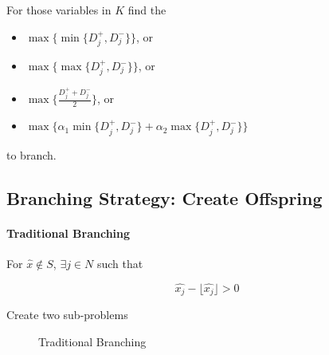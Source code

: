                 For those variables in $K$ find the
                \begin{itemize}
                    \item $\max \{\min\{ {D_j^+},  {D_j^-}\}\}$, or
                    \item $\max \{\max\{ {D_j^+},  {D_j^-}\}\}$, or
                    \item $\max \{\frac{D_j^+ + D_j^-}{2}\}$, or
                    \item $\max \{\alpha_1\min\{ {D_j^+},  {D_j^-}\} + \alpha_2\max\{ {D_j^+},  {D_j^-}\}\}$
                \end{itemize}
                
                to branch.

        \subsection{Branching Strategy: Create Offspring}

            \paragraph{Traditional Branching}
                For $\hat{x} \notin S$, $\exists j \in N$ such that

                \begin{equation*}\hat{x_j} -\lfloor\hat{x_j}\rfloor > 0 \end{equation*}

                Create two sub-problems

                \begin{figure}[H]
                    \centering
                    \caption{Traditional Branching}
                \end{figure}


